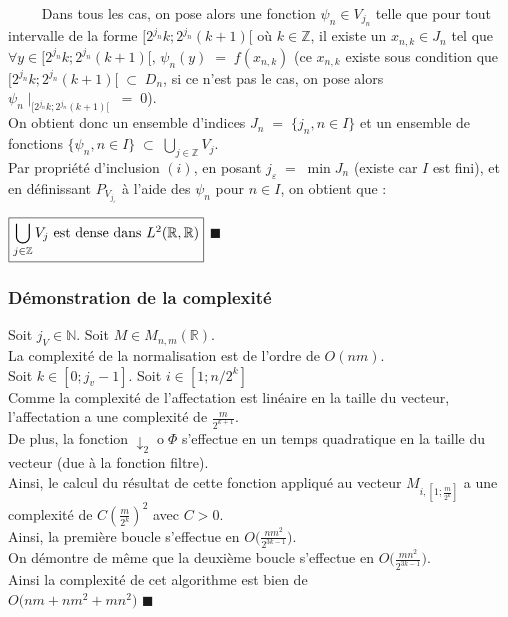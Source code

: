 \documentclass[10pt]{beamer}
\begin{document}
\begin{frame}[allowframebreaks]
	  $\phantom{Prop}$ Dans tous les cas, on pose alors une fonction $ \psi_n \in V_{j_n} $ telle que pour tout intervalle de la forme $[2^{j_n} k; 2^{j_n} (k + 1)[$ o\`{u} $k \in \mathbb{Z}$,
	  il existe un $x_{n,k} \in J_n$ tel que $ \forall y \in [2^{j_n} k; 2^{j_n} (k + 1)[, \, \psi_n (y) \; = \; f(x_{n,k})$ 
	  (ce $x_{n,k}$ existe sous condition que $ [2^{j_n} k; 2^{j_n} (k + 1)[ \; \subset \; D_n $, si ce n'est pas le cas,
	  on pose alors $ \psi_n \mid_{[2^{j_n} k; 2^{j_n} (k + 1)[} \; = \; 0$). \\
	  
	  On obtient donc un ensemble d'indices $J_n \; = \; \Big\{ j_n, n \in I \Big\}$
	  et un ensemble de fonctions $\Big\{ \psi_n , n \in I \Big\} \; \subset \; \displaystyle \bigcup_{j \in \mathbb{Z}} V_j $. \\
	  
	  Par propri\'{e}t\'{e} d'inclusion $(i)$, en posant $j_{\varepsilon} \; = \; \min J_n$ (existe car $I$ est fini),
	  et en d\'{e}finissant $P_{V_{j_{\varepsilon}}}$ \`{a} l'aide des $\psi_n$ pour $n \in I$, on obtient que :
	  
	  \begin{center}
	    $ \boxed{\displaystyle \bigcup_{j \in \mathbb{Z}} V_j $ est dense dans $ L^2(\mathbb{R}, \mathbb{R})} $  $\blacksquare$
	  \end{center}
    \end{frame}
    
    \begin{frame}
      \frametitle{D\'{e}monstration de la complexit\'{e}}
      
	Soit $j_V \in \mathbb{N}$. Soit $M \in M_{n,m}(\mathbb{R})$. \\
	La complexit\'{e} de la normalisation est de l'ordre de $O (nm) $. \\
	Soit $k \in [0; j_v - 1]$. Soit $i \in [1;n/2^k]$ \\
	Comme la complexit\'{e} de l'affectation est lin\'{e}aire en la taille du vecteur,
	l'affectation a une complexit\'{e} de $ \frac{m}{2^{k+1}}$.\\
	De plus, la fonction $ \downarrow_2 \; $o$ \; \varPhi $ s'effectue en un temps quadratique en la taille du vecteur 
	(due \`{a} la fonction filtre).\\
	Ainsi, le calcul du r\'{e}sultat de cette fonction appliqu\'{e} au vecteur $M_{i, [1;\frac{m}{2^k}]}$ a une 
	complexit\'{e} de $C (\frac{m}{2^k})^2$ avec $C > 0$. \\

	Ainsi, la premi\`{e}re boucle s'effectue en $ O \Big(\frac{n m^2}{2^{3k - 1}} \Big) $. \\
	On d\'{e}montre de m\^{e}me que la deuxi\`{e}me boucle s'effectue en $ O \Big(\frac{m n^2}{2^{3k - 1}} \Big) $. \\
	
	Ainsi la complexit\'{e} de cet algorithme est bien de \\
	$ \boxed{O \Big(nm + n m^2 + m n^2 \Big)} $  $\blacksquare$
    \end{frame}
\end{document}
